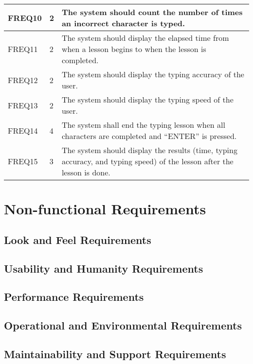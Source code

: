 \documentclass[12pt, titlepage]{article}
\begin{document}
\begin{center}
\begin{longtable}{ |m{2cm}|m{1.8cm}|m{9.4cm}| }
    \hline
    FREQ10 & 2 & The system should count the number of times an incorrect character is typed. \\ 
    \hline
    FREQ11 & 2 & The system should display the elapsed time from when a lesson begins to when the lesson is completed. \\ 
    \hline
    FREQ12 & 2 & The system should display the typing accuracy of the user. \\ 
    \hline
    FREQ13 & 2 & The system should display the typing speed of the user. \\ 
    \hline
    FREQ14 & 4 & The system shall end the typing lesson when all characters are completed and “ENTER” is pressed. \\ 
    \hline
    FREQ15 & 3 & The system should display the results (time, typing accuracy, and typing speed) of the lesson after the lesson is done. \\ 
    \hline
\end{longtable}
\end{center}



\section{Non-functional Requirements}

\subsection{Look and Feel Requirements}

\subsection{Usability and Humanity Requirements}

\subsection{Performance Requirements}

\subsection{Operational and Environmental Requirements}

\subsection{Maintainability and Support Requirements}
\end{document}
